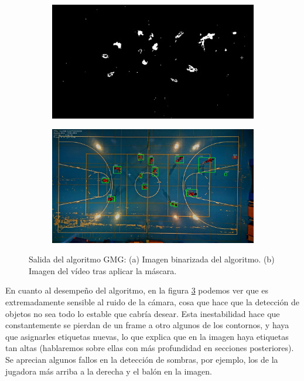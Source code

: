 \begin{figure}
\begin{subfigure}{.5\textwidth}
  \centering
  \includegraphics[width=.9\linewidth]{images/GMGsub}
  \caption { }
  \label{fig:GMG1a}
\end{subfigure}%
\begin{subfigure}{.5\textwidth}
  \centering
  \includegraphics[width=.9\linewidth]{images/GMG}
  \caption { }
  \label{fig:GMG1b}
\end{subfigure}
\caption{Salida del algoritmo GMG: (a) Imagen binarizada del algoritmo. (b) Imagen del vídeo tras aplicar la máscara.}
\label{fig:GMG}
\end{figure}

En cuanto al desempeño del algoritmo, en la figura \ref{fig:GMG} podemos ver que es extremadamente sensible al ruido de la cámara, cosa que hace que la detección de objetos no sea todo lo estable que cabría desear. Esta inestabilidad hace que constantemente se pierdan de un frame a otro algunos de los contornos, y haya que asignarles etiquetas nuevas, lo que explica que en la imagen haya etiquetas tan altas (hablaremos sobre ellas con más profundidad en secciones posteriores). Se aprecian algunos fallos en la detección de sombras, por ejemplo, los de la jugadora más arriba a la derecha y el balón en la imagen. 


